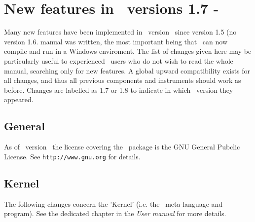 
\chapter{New features in \MCS\ versions 1.7 - \version\ }
\label{c:changes}

Many new features have been implemented in \MCS\ version \version\  since
version 1.5 (no version 1.6. manual was written, the most important being that
\MCS\ can now compile and run in a Windows enviroment.  The list of changes
given here may be particularly  useful to experienced \MCS\ users who do not
wish to read the whole  manual, searching only for new features. A global
upward compatibility  exists for all changes, and thus all previous components
and  instruments should work as before. Changes are labelled as 1.7 or 1.8 to 
indicate in which \MCS\ version they appeared.

\section{General}
\label{s:new-features:general}
As of \MCS\ version \version\, the license covering the \MCS\ package
is the GNU General Pubclic License. See \verb+http://www.gnu.org+ for details.

\section{Kernel} 
\label{s:new-features:kernel}

The following changes concern the 'Kernel' (i.e. the \MCS\ meta-language and program). See the dedicated chapter in the {\it User manual} for more details.

